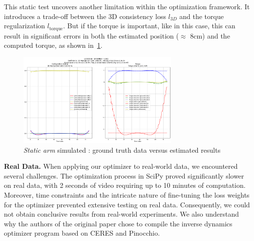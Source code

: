 This static test uncovers another limitation within the optimization framework. It introduces a 
trade-off between the 3D consistency loss \(l_{3D}\) and the torque regularization 
\(l_{\text{torque}}\). But if the torque is important, like in this case, this can result in 
significant errors in both the estimated 
position ($\approx$ 8cm) and the computed torque, as shown in~\cref{fig:static}.

\begin{figure}
    \centering
    \includegraphics[width=8cm]{figures/inverse_dynamics_static_case.png}
    \caption{\textit{Static arm} simulated : ground truth data versus estimated results}
    \label{fig:static}
\end{figure}



\noindent\textbf{Real Data.} When applying our optimizer to real-world data, we encountered several challenges. 
The optimization process in SciPy proved significantly slower on real data, with 2 seconds of video requiring up to 10 minutes of 
computation. Moreover, time constraints and the intricate nature of fine-tuning the loss weights for the optimizer prevented extensive 
testing on real data. Consequently, we could not obtain conclusive results from real-world experiments. We also understand
why the authors of the original paper chose to compile the inverse dynamics optimizer program based on CERES and Pinocchio.